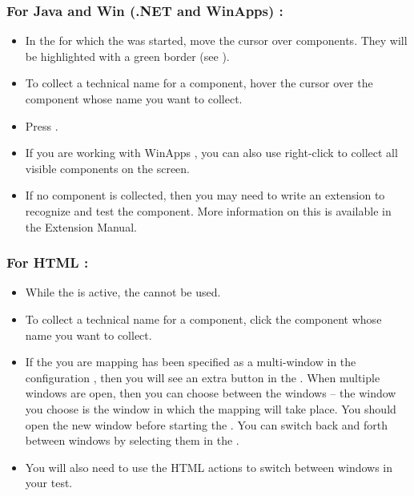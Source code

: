 \subsubsection{For Java and Win (.NET and WinApps) \gdauts{}:}
\begin{itemize}
\item In the \gdaut{} for which the \gdomm{} was started, move the cursor over components. They will be highlighted with a green border (see ). 
\item To collect a technical name for a component, hover the cursor over the component whose name you want to collect. 
\item Press .
\item If you are working with WinApps \gdauts{}, you can also use right-click to collect all visible components on the screen. 
\item If no component is collected, then you may need to write an extension to recognize and test the component. More information on this is available in the Extension Manual.
\end{itemize}

\subsubsection{For HTML \gdauts{}:}
\begin{itemize}
\item While the \gdomm{} is active, the \gdaut{} cannot be used. 
\item To collect a technical name for a component, click the component whose name you want to collect. 
\item If the \gdaut{} you are mapping has been specified as a multi-window \gdaut{} in the \gdaut{} configuration , then you will see an extra button in the \gdomeditor{}. When multiple windows are open, then you can choose between the windows -- the window you choose is the window in which the mapping will take place. You should open the new window before starting the \gdomm{}. You can switch back and forth between windows by selecting them in the \gdomeditor{}. 
\item You will also need to use the HTML actions to switch between windows in your test. 
\end{itemize}

